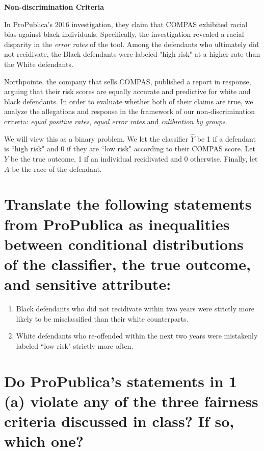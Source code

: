 \documentclass[12pt, addpoints]{exam}
\begin{document}
\begin{questions}

\question[35] \textbf{Non-discrimination Criteria}

In ProPublica's 2016 investigation, they claim that COMPAS exhibited racial bias against black individuals. Specifically, the investigation revealed a racial disparity in the \emph{error rates} of the tool. Among the defendants who ultimately did not recidivate, the Black
defendants were labeled "high risk" at a higher rate than the White
defendants.

Northpointe, the company that sells COMPAS, published a report in response, arguing that their risk scores are equally accurate and predictive for white and black defendants.
In order to evaluate whether both of their claims are true, we analyze the allegations and response in the framework of our non-discrimination criteria: \textit{equal positive rates},  \textit{equal error rates} and \textit{calibration by groups}. 

We will view this as a binary problem. We let the classifier $\hat{Y}$ be 1 if a defendant is ``high risk" and 0 if they are ``low risk" according to their COMPAS score.
Let $Y$ be the true outcome, 1 if an individual recidivated and 0 otherwise. Finally, let $A$ be the race of the defendant. 

\begin{parts}
\part[8]{\bf Translate the following statements from ProPublica as inequalities between conditional distributions of the classifier, 
the true outcome, and sensitive attribute:}
\begin{enumerate}[(1)]
\item Black defendants who did not recidivate within two years were strictly more likely to be misclassified than their white counterparts.
\item White defendants who re-offended within the next two years were mistakenly labeled ``low risk" strictly more often.
\end{enumerate}
    
\part[4]  {\bf Do ProPublica's statements in 1 (a) violate any of the three fairness criteria
discussed in class? If so, which one?}
    

\end{parts}
\end{questions}
\end{document}
